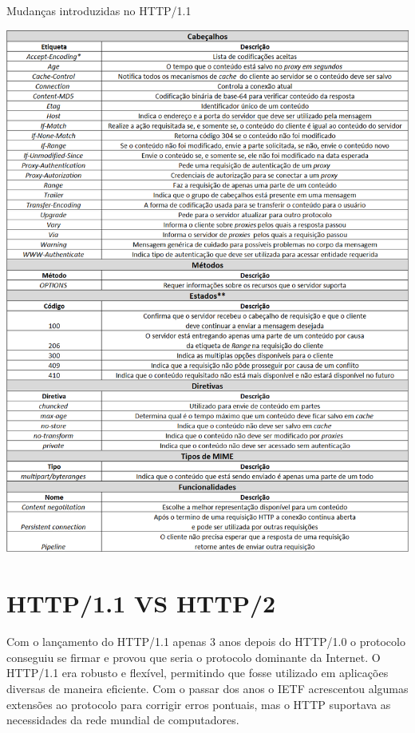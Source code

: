 \begin{quadro}[H]
	\caption{Mudanças introduzidas no HTTP/1.1}
	\centering
	\includegraphics[width=1.0\textwidth]{./04-figuras/fund-teorica/http11novo}
	\label{qua:http11novo}
\end{quadro}


\section{HTTP/1.1 VS HTTP/2}
\label{sec:http_11_vs_http_2}

Com o lançamento do HTTP/1.1 apenas 3 anos depois do HTTP/1.0 o protocolo conseguiu se firmar e provou que seria o protocolo dominante da Internet. O HTTP/1.1 era robusto e flexível, permitindo que fosse utilizado em aplicações diversas de maneira eficiente. Com o passar dos anos o IETF acrescentou algumas extensões ao protocolo para corrigir erros pontuais, mas o HTTP suportava as necessidades da rede mundial de computadores.

